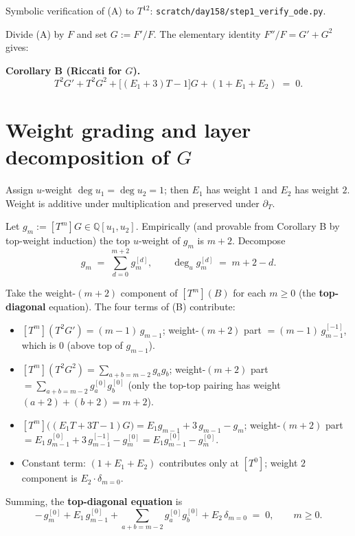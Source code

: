 \documentclass[11pt]{article}
\begin{document}
Symbolic verification of (A) to $T^{12}$: \texttt{scratch/day158/step1\_verify\_ode.py}.

Divide (A) by $F$ and set $G := F'/F$. The elementary identity $F''/F = G' + G^2$ gives:

\noindent\textbf{Corollary B (Riccati for $G$).}
\begin{equation}\tag{B}
T^2 G' + T^2 G^2 + \big[(E_1 + 3)T - 1\big] G + (1 + E_1 + E_2) \;=\; 0.
\end{equation}

\section{Weight grading and layer decomposition of $G$}

Assign $u$-weight $\deg u_1 = \deg u_2 = 1$; then $E_1$ has weight $1$ and $E_2$ has weight $2$. Weight is additive under multiplication and preserved under $\partial_T$.

Let $g_m := [T^m] G \in \mathbb Q[u_1, u_2]$. Empirically (and provable from Corollary B by top-weight induction) the top $u$-weight of $g_m$ is $m + 2$. Decompose
$$g_m \;=\; \sum_{d = 0}^{m+2} g_m^{[d]}, \qquad \deg_u g_m^{[d]} \;=\; m + 2 - d.$$

Take the weight-$(m+2)$ component of $[T^m](B)$ for each $m \ge 0$ (the \textbf{top-diagonal} equation). The four terms of (B) contribute:

\begin{itemize}
  \item $[T^m](T^2 G') = (m-1)\,g_{m-1}$; weight-$(m+2)$ part $= (m-1)\,g_{m-1}^{[-1]}$, which is $0$ (above top of $g_{m-1}$).
  \item $[T^m](T^2 G^2) = \sum_{a+b=m-2} g_a g_b$; weight-$(m+2)$ part $= \sum_{a+b=m-2} g_a^{[0]} g_b^{[0]}$ (only the top-top pairing has weight $(a+2)+(b+2) = m+2$).
  \item $[T^m]\big((E_1 T + 3T - 1) G\big) = E_1 g_{m-1} + 3\,g_{m-1} - g_m$; weight-$(m+2)$ part $= E_1\,g_{m-1}^{[0]} + 3\,g_{m-1}^{[-1]} - g_m^{[0]} = E_1 g_{m-1}^{[0]} - g_m^{[0]}$.
  \item Constant term: $(1 + E_1 + E_2)$ contributes only at $[T^0]$; weight $2$ component is $E_2 \cdot \delta_{m=0}$.
\end{itemize}

Summing, the \textbf{top-diagonal equation} is
\begin{equation}\tag{$\top$}
-\,g_m^{[0]} + E_1\,g_{m-1}^{[0]} + \sum_{a+b=m-2} g_a^{[0]} g_b^{[0]} + E_2\,\delta_{m=0} \;=\; 0, \qquad m \ge 0.
\end{equation}
\end{document}

